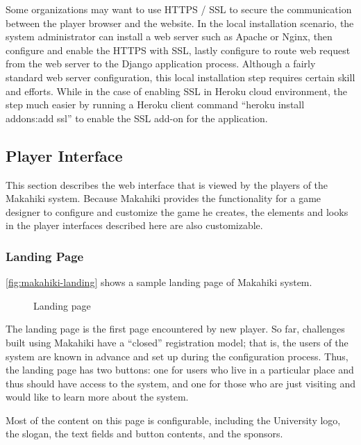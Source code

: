 Some organizations may want to use HTTPS / SSL to secure the communication between the player browser and the website. In the local installation scenario, the system administrator can install a web server such as Apache or Nginx, then configure and enable the HTTPS with SSL, lastly configure to route web request from the web server to the Django application process. Although a fairly standard web server configuration, this local installation step requires certain skill and efforts. While in the case of enabling SSL in Heroku cloud environment, the step much easier by running a Heroku client command ``heroku install addons:add ssl'' to enable the SSL add-on for the application.

\subsection{Player Interface}

This section describes the web interface that is viewed by the players of the Makahiki system. Because Makahiki provides the functionality for a game designer to configure and customize the game he creates, the elements and looks in the player interfaces described here are also customizable. 

\subsubsection{Landing Page}
\autoref{fig:makahiki-landing} shows a sample landing page of Makahiki system.

\begin{figure}[!ht]
\begin{center}
\end{center}
\caption{Landing page}
\label{fig:makahiki-landing}
\end{figure}

The landing page is the first page encountered by new player. So far, challenges built using Makahiki have a ``closed'' registration model; that is, the users of the system are known in advance and set up during the configuration process. Thus, the landing page has two buttons: one for users who live in a particular place and thus should have access to the system, and one for those who are just visiting and would like to learn more about the system.

Most of the content on this page is configurable, including the University logo, the slogan, the text fields and button contents, and the sponsors.

